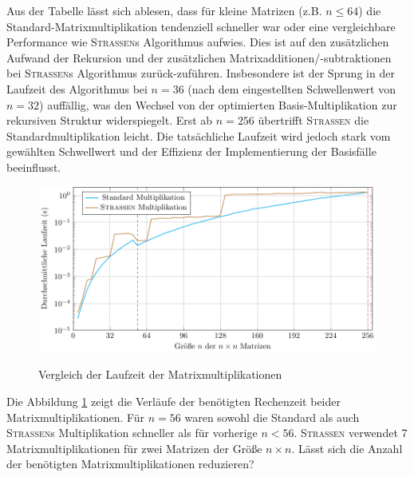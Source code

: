 \documentclass{scrartcl}
\begin{document}
Aus der Tabelle lässt sich ablesen, dass für kleine Matrizen (z.B. $n \le 64$) die Standard-Matrixmultiplikation tendenziell schneller war oder eine vergleichbare Performance wie \textsc{Strassen}s Algorithmus aufwies. Dies ist auf den zusätzlichen Aufwand der Rekursion und der zusätzlichen Matrixadditionen/-subtraktionen bei \textsc{Strassen}s Algorithmus zurück-zuführen. Insbesondere ist der Sprung in der Laufzeit des Algorithmus bei $n=36$ (nach dem eingestellten Schwellenwert von $n=32$) auffällig, was den Wechsel von der optimierten Basis-Multiplikation zur rekursiven Struktur widerspiegelt. Erst ab $n=256$ übertrifft \textsc{Strassen} die Standardmultiplikation leicht. Die tatsächliche Laufzeit wird jedoch stark vom gewählten Schwellwert und der Effizienz der Implementierung der Basisfälle beeinflusst.

\begin{figure}[h]
	\centering
	\caption{Vergleich der Laufzeit der Matrixmultiplikationen}
	\includegraphics[width=1.0\textwidth]{results.pdf}
	\label{fig:time-comparison}
\end{figure}

Die Abbildung \ref{fig:time-comparison} zeigt die Verläufe der benötigten Rechenzeit beider Matrixmultiplikationen. Für $n = 56$ waren sowohl die Standard als auch \textsc{Strassen}s Multiplikation schneller als für vorherige $n < 56$. \textsc{Strassen} verwendet 7 Matrixmultiplikationen für zwei Matrizen der Größe $n \times n$. Lässt sich die Anzahl der benötigten Matrixmultiplikationen reduzieren?
\end{document}
